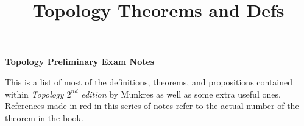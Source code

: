 
\title{Topology Theorems and Defs}

\newcommand{\thrm}[1]{\textbf{Theorem #1. }}
\newcommand{\lemm}[1]{\textbf{Lemma #1. }}
\newcommand{\prp}[1]{\textbf{Proposition #1. }}
\newcommand{\Lam}{\Lambda}


\begin{center}
\textbf{\Large Topology Preliminary Exam Notes}
\end{center}

This is a list of most of the definitions, theorems, and propositions contained within \textit{Topology $2^{nd}$ edition} by Munkres as well as some extra useful ones. References made in red in this series of notes refer to the actual number of the theorem in the book.\\

\setcounter{tocdepth}{1}
\tableofcontents
\newpage












